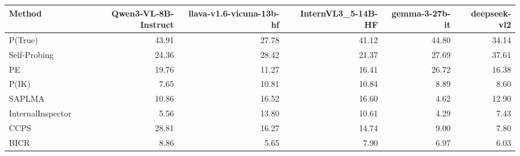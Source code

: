 \begin{tabular}{lrrrrr}
\toprule
Method & Qwen3-VL-8B-Instruct & llava-v1.6-vicuna-13b-hf & InternVL3_5-14B-HF & gemma-3-27b-it & deepseek-vl2 \\
\midrule
P(True) & 43.91 & 27.78 & 41.12 & 44.80 & 34.14 \\
Self-Probing & 24.36 & 28.42 & 21.37 & 27.69 & 37.61 \\
PE & 19.76 & 11.27 & 16.41 & 26.72 & 16.38 \\
P(IK) & 7.65 & 10.81 & 10.84 & 8.89 & 8.60 \\
SAPLMA & 10.86 & 16.52 & 16.60 & 4.62 & 12.90 \\
InternalInspector & 5.56 & 13.80 & 10.61 & 4.29 & 7.43 \\
CCPS & 28.81 & 16.27 & 14.74 & 9.00 & 7.80 \\
BICR & 8.86 & 5.65 & 7.90 & 6.97 & 6.03 \\
\bottomrule
\end{tabular}
